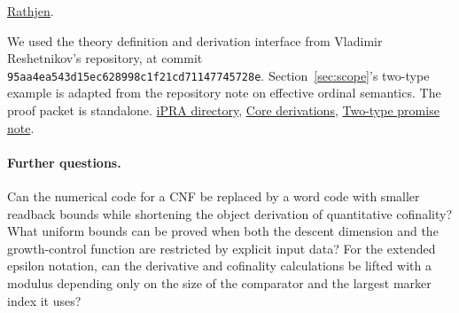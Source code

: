 \begin{description}[leftmargin=.8em,labelindent=0pt,style=nextline]
\href{https://arxiv.org/abs/1405.4484}{Rathjen}.
\item[ProveIt.] We used the theory definition and derivation interface from Vladimir Reshetnikov's repository, at commit \texttt{95aa4ea543d15ec628998c1f21cd71147745728e}. Section~\ref{sec:scope}'s two-type example is adapted from the repository note on effective ordinal semantics. The proof packet is standalone.
\href{https://github.com/VladimirReshetnikov/ProveIt/tree/95aa4ea543d15ec628998c1f21cd71147745728e/Logic/PrimitiveRecursiveArithmetic}{iPRA directory},
\href{https://github.com/VladimirReshetnikov/ProveIt/tree/95aa4ea543d15ec628998c1f21cd71147745728e/Logic/PrimitiveRecursiveArithmetic/Derivations/Lean/IPRADerivations/Core}{Core derivations},
\href{https://github.com/VladimirReshetnikov/ProveIt/blob/95aa4ea543d15ec628998c1f21cd71147745728e/Computability/HilbertTenthProblem/Papers/research-wip/native-stream-queue/ordinal_two_type_effectivity_boundary.md}{Two-type promise note}.
\end{description}
\paragraph{Further questions.}
Can the numerical code for a CNF be replaced by a word code with smaller readback bounds while shortening the object derivation of quantitative cofinality? What uniform bounds can be proved when both the descent dimension and the growth-control function are restricted by explicit input data? For the extended epsilon notation, can the derivative and cofinality calculations be lifted with a modulus depending only on the size of the comparator and the largest marker index it uses?
